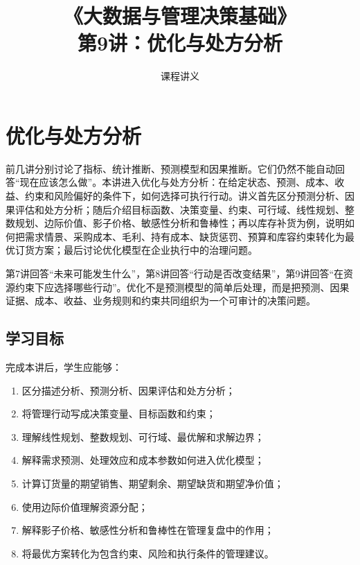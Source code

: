 \documentclass[UTF8,fontset=fandol,openany,zihao=-4]{ctexbook}
\title{《大数据与管理决策基础》\\[0.5em]\large 第9讲：优化与处方分析}
\author{课程讲义}
\date{}
\begin{document}
\maketitle
\tableofcontents

\setcounter{chapter}{8}
\chapter{优化与处方分析}
\label{ch:week09-optimization}

\begin{chapterbox}
前几讲分别讨论了指标、统计推断、预测模型和因果推断。它们仍然不能自动回答“现在应该怎么做”。本讲进入优化与处方分析：在给定状态、预测、成本、收益、约束和风险偏好的条件下，如何选择可执行行动。讲义首先区分预测分析、因果评估和处方分析；随后介绍目标函数、决策变量、约束、可行域、线性规划、整数规划、边际价值、影子价格、敏感性分析和鲁棒性；再以库存补货为例，说明如何把需求情景、采购成本、毛利、持有成本、缺货惩罚、预算和库容约束转化为最优订货方案；最后讨论优化模型在企业执行中的治理问题。
\end{chapterbox}

\begin{modernbox}[课程接口]
第7讲回答“未来可能发生什么”，第8讲回答“行动是否改变结果”，第9讲回答“在资源约束下应选择哪些行动”。优化不是预测模型的简单后处理，而是把预测、因果证据、成本、收益、业务规则和约束共同组织为一个可审计的决策问题。
\end{modernbox}

\section{学习目标}

完成本讲后，学生应能够：
\begin{enumerate}
  \item 区分描述分析、预测分析、因果评估和处方分析；
  \item 将管理行动写成决策变量、目标函数和约束；
  \item 理解线性规划、整数规划、可行域、最优解和求解边界；
  \item 解释需求预测、处理效应和成本参数如何进入优化模型；
  \item 计算订货量的期望销售、期望剩余、期望缺货和期望净价值；
  \item 使用边际价值理解资源分配；
  \item 解释影子价格、敏感性分析和鲁棒性在管理复盘中的作用；
  \item 将最优方案转化为包含约束、风险和执行条件的管理建议。
\end{enumerate}
\end{document}
